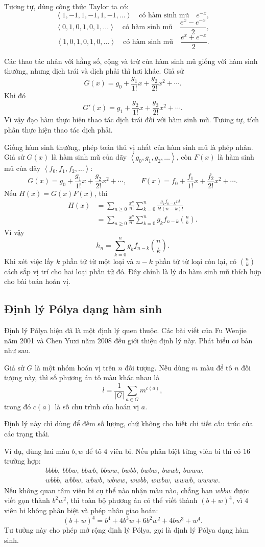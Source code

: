 \documentclass[11pt]{article}
\newcommand{\seq}[1]{\left\langle #1\right\rangle}
\newcommand{\C}[2]{\binom{#1}{#2}}
\begin{document}
Tương tự, dùng công thức Taylor ta có:
\[
  \seq{1,-1,1,-1,1,-1,\ldots}
  \quad\text{có hàm sinh mũ}\quad e^{-x},
\]
\[
  \seq{0,1,0,1,0,1,\ldots}
  \quad\text{có hàm sinh mũ}\quad \frac{e^x-e^{-x}}2,
\]
\[
  \seq{1,0,1,0,1,0,\ldots}
  \quad\text{có hàm sinh mũ}\quad \frac{e^x+e^{-x}}2.
\]

Các thao tác nhân với hằng số, cộng và trừ của hàm sinh mũ giống với hàm sinh
thường, nhưng dịch trái và dịch phải thì hơi khác. Giả sử
\[
  G(x)=g_0+\frac{g_1}{1!}x+\frac{g_2}{2!}x^2+\cdots.
\]
Khi đó
\[
  G'(x)=g_1+\frac{g_2}{1!}x+\frac{g_3}{2!}x^2+\cdots.
\]
Vì vậy đạo hàm thực hiện thao tác dịch trái đối với hàm sinh mũ. Tương tự,
tích phân thực hiện thao tác dịch phải.

Giống hàm sinh thường, phép toán thú vị nhất của hàm sinh mũ là phép nhân.
Giả sử \(G(x)\) là hàm sinh mũ của dãy \(\seq{g_0,g_1,g_2,\ldots}\), còn
\(F(x)\) là hàm sinh mũ của dãy \(\seq{f_0,f_1,f_2,\ldots}\):
\[
  G(x)=g_0+\frac{g_1}{1!}x+\frac{g_2}{2!}x^2+\cdots,\qquad
  F(x)=f_0+\frac{f_1}{1!}x+\frac{f_2}{2!}x^2+\cdots.
\]
Nếu \(H(x)=G(x)F(x)\), thì
\[
\begin{aligned}
  H(x)
  &=\sum_{n\ge0}\frac{x^n}{n!}
    \sum_{k=0}^n
      \frac{g_k f_{n-k} n!}{k!(n-k)!}\\
  &=\sum_{n\ge0}\frac{x^n}{n!}
    \sum_{k=0}^n g_k f_{n-k}\C{n}{k}.
\end{aligned}
\]
Vì vậy
\[
  h_n=\sum_{k=0}^n g_k f_{n-k}\C{n}{k}.
\]
Khi xét việc lấy \(k\) phần tử từ một loại và \(n-k\) phần tử từ loại còn
lại, có \(\C{n}{k}\) cách sắp vị trí cho hai loại phần tử đó. Đây chính là lý
do hàm sinh mũ thích hợp cho bài toán hoán vị.

\subsection{Định lý Pólya dạng hàm sinh}

Định lý Pólya hiện đã là một định lý quen thuộc. Các bài viết của Fu Wenjie
năm 2001 và Chen Yuxi năm 2008 đều giới thiệu định lý này. Phát biểu cơ bản
như sau.

Giả sử \(G\) là một nhóm hoán vị trên \(n\) đối tượng. Nếu dùng \(m\) màu để
tô \(n\) đối tượng này, thì số phương án tô màu khác nhau là
\[
  l=\frac1{|G|}\sum_{a\in G}m^{c(a)},
\]
trong đó \(c(a)\) là số chu trình của hoán vị \(a\).

Định lý này chỉ dùng để đếm số lượng, chứ không cho biết chi tiết cấu trúc
của các trạng thái.

Ví dụ, dùng hai màu \(b,w\) để tô \(4\) viên bi. Nếu phân biệt từng viên bi
thì có \(16\) trường hợp:
\[
\begin{gathered}
bbbb,\ bbbw,\ bbwb,\ bbww,\ bwbb,\ bwbw,\ bwwb,\ bwww,\\
wbbb,\ wbbw,\ wbwb,\ wbww,\ wwbb,\ wwbw,\ wwwb,\ wwww.
\end{gathered}
\]
Nếu không quan tâm viên bi cụ thể nào nhận màu nào, chẳng hạn \(wbbw\) được
viết gọn thành \(b^2w^2\), thì toàn bộ phương án có thể viết thành
\((b+w)^4\), vì \(4\) viên bi không phân biệt và phép nhân giao hoán:
\[
  (b+w)^4=b^4+4b^3w+6b^2w^2+4bw^3+w^4.
\]
Tư tưởng này cho phép mở rộng định lý Pólya, gọi là định lý Pólya dạng hàm
sinh.
\end{document}
